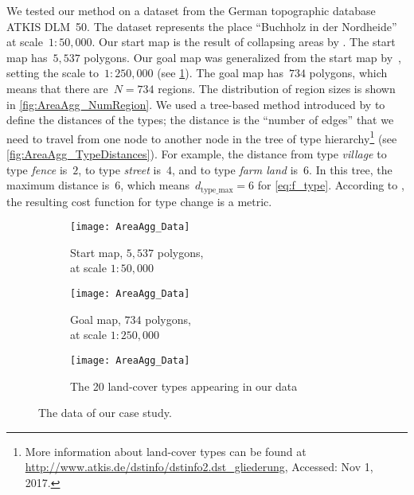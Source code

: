 \documentclass[acmsmall,natbib=false]{acmart}
\begin{document}
We tested our method on a dataset 
from the German topographic database ATKIS DLM~50. 
The dataset represents the place 
``Buchholz in der Nordheide'' at scale~$1:50{,}000$. 
Our start map is the result of collapsing areas 
by \citet[]{haunert2008f}.
The start map has~$5{,}537$ polygons. 
Our goal map was generalized from the start map 
by~\citet{HaunertWolff2010AreaAgg}, setting the scale 
to~$1:250{,}000$ (see \fig\ref{fig:AreaAgg_Data}). 
The goal map has~$734$ polygons, 
which means that there are~$N=734$ regions.
The distribution of region sizes is shown in 
\fig\ref{fig:AreaAgg_NumRegion}.
%
We used a tree-based method introduced by 
\citet{Rada1989SemanticMetric} 
to define the distances of the types;
the distance is the ``number of edges'' that
we need to travel from one node to another node in the tree of 
type hierarchy\footnote{More information 
    about land-cover types can be found at 
	\url{http://www.atkis.de/dstinfo/dstinfo2.dst_gliederung},
	Accessed: Nov 1, 2017.}
(see \fig\ref{fig:AreaAgg_TypeDistances}). 
For example, the distance from type \emph{village}
to type \emph{fence} is~$2$, 
to type \emph{street} is~$4$, and
to type \emph{farm land} is~$6$.
In this tree, the maximum distance is~$6$, 
which means~$d_\mathrm{type\_max}=6$ for \eq\ref{eq:f_type}.
According to \citet{Rada1989SemanticMetric}, 
the resulting cost function for type change is a metric.


\begin{figure}[tb]
\begin{subfigure}[b]{.49\textwidth}
\centering
\texttt{[image: AreaAgg\_Data]}
\caption{Start map, $5{,}537$ polygons, \\
	at scale $1:50{,}000$}
\end{subfigure}
\hfill
\begin{subfigure}[b]{.49\textwidth}
\centering
\texttt{[image: AreaAgg\_Data]}
\caption{Goal map, $734$ polygons, \\
	at scale $1:250{,}000$}
\end{subfigure}
%
\par\vspace{\baselineskip} %
%
\begin{subfigure}{\textwidth}
\centering
\texttt{[image: AreaAgg\_Data]}
\caption{The 20 land-cover types appearing in our data}
\end{subfigure}
\caption{The data of our case study.}
\label{fig:AreaAgg_Data}
\end{figure}
\end{document}
